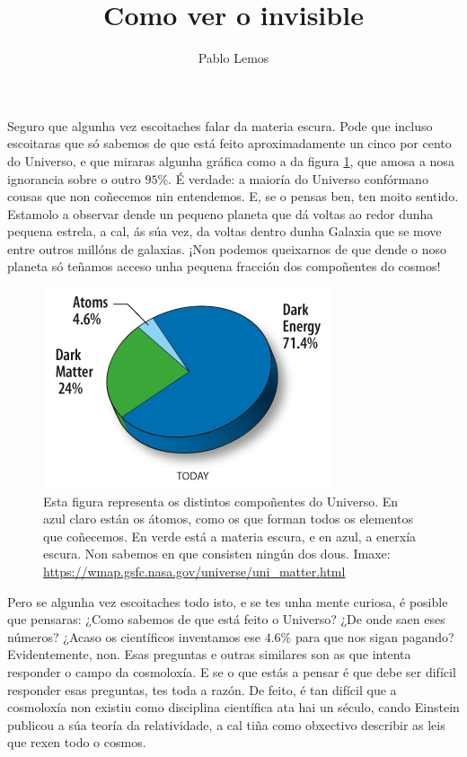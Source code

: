 \documentclass{article}
\title{Como ver o invisible}
\author{Pablo Lemos}
\begin{document}
\maketitle

Seguro que algunha vez escoitaches falar da materia escura. Pode que incluso escoitaras 
que só sabemos de que está feito aproximadamente un cinco por cento do Universo, e 
que miraras algunha gráfica como a da figura \ref{fig:piechart}, que amosa a nosa 
ignorancia sobre o outro $95 \%$. É verdade: a maioría do Universo confórmano cousas que non 
coñecemos nin entendemos. E, se o pensas ben, ten moito sentido. Estamolo a observar dende 
un pequeno planeta que dá voltas ao redor dunha pequena estrela, a cal, ás súa vez, da voltas dentro 
dunha Galaxia que se move entre outros millóns de galaxias. ¡Non podemos queixarnos de 
que dende o noso planeta só teñamos acceso unha pequena fracción dos compoñentes do cosmos!

\begin{figure}[h]
\includegraphics{piechart.pdf}
\caption{Esta figura representa os distintos compoñentes do Universo. En azul claro están 
os átomos, como os que forman todos os elementos que coñecemos. En verde está a materia 
escura, e en azul, a enerxía escura. Non sabemos en que consisten ningún dos dous. 
Imaxe: \url{https://wmap.gsfc.nasa.gov/universe/uni_matter.html}
\label{fig:piechart}
}
\end{figure}


Pero se algunha vez escoitaches todo isto, e se tes unha mente curiosa, é posible que 
pensaras: ¿Como sabemos de que está feito o Universo? ¿De onde saen eses números? 
¿Acaso os científicos inventamos ese $4.6 \%$ para que nos sigan pagando? Evidentemente, non. 
Esas preguntas e outras similares son as que intenta responder o campo da cosmoloxía. 
E se o que estás a pensar é que debe ser difícil responder esas preguntas, tes toda a razón. 
De feito, é tan difícil que a cosmoloxía non existiu como disciplina científica ata hai un 
século, cando Einstein publicou a súa teoría da relatividade, a cal tiña como obxectivo describir 
as leis que rexen todo o cosmos. 
\end{document}

